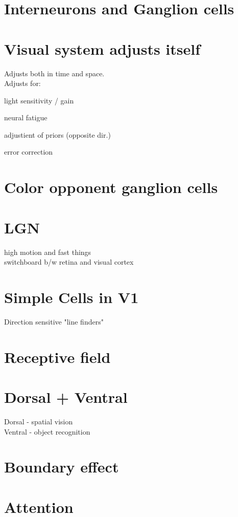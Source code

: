\documentclass{article}
\begin{document}
\section{Interneurons and Ganglion cells}


\section{Visual system adjusts itself}
Adjusts both in time and space.
\\
Adjusts for:
\begin{list}{}{}
  \item light sensitivity / gain
  \item neural fatigue
  \item adjustient of priors (opposite dir.)
  \item error correction
\end{list}

\section{Color opponent ganglion cells}

\section{LGN}
high motion and fast things \\
switchboard b/w retina and visual cortex

\section{Simple Cells in V1}
Direction sensitive "line finders"


\section{Receptive field}

\section{Dorsal + Ventral}
Dorsal - spatial vision
\\
Ventral - object recognition


\section{Boundary effect}

\section{Attention}
\end{document}
